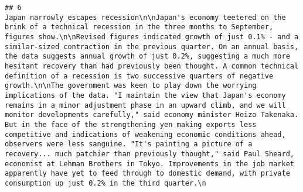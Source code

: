 \documentclass[
]{article}
\begin{document}
\begin{verbatim}
## 6                                                                                                                                                                                                                                                                                                                                                                                                                                                                                                                                                                                                                                                                                                                                                                                                                                                                                                                                                                                                                                                                                                                                                                                                                                                                                                                                                                                                                                 Japan narrowly escapes recession\n\nJapan's economy teetered on the brink of a technical recession in the three months to September, figures show.\n\nRevised figures indicated growth of just 0.1% - and a similar-sized contraction in the previous quarter. On an annual basis, the data suggests annual growth of just 0.2%, suggesting a much more hesitant recovery than had previously been thought. A common technical definition of a recession is two successive quarters of negative growth.\n\nThe government was keen to play down the worrying implications of the data. "I maintain the view that Japan's economy remains in a minor adjustment phase in an upward climb, and we will monitor developments carefully," said economy minister Heizo Takenaka. But in the face of the strengthening yen making exports less competitive and indications of weakening economic conditions ahead, observers were less sanguine. "It's painting a picture of a recovery... much patchier than previously thought," said Paul Sheard, economist at Lehman Brothers in Tokyo. Improvements in the job market apparently have yet to feed through to domestic demand, with private consumption up just 0.2% in the third quarter.\n
\end{verbatim}
\end{document}

